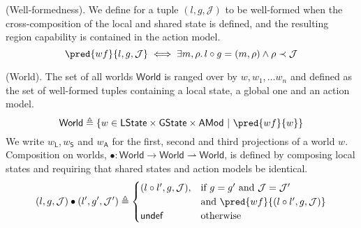  (Well-formedness). We define for a tuple $(l, g, \mathcal{J})$ to be well-formed when the cross-composition of the local and shared state is defined, and the resulting region capability is contained in the action model.
\[
	\pred{wf}{l, g, \mathcal{J}} \iff \exists m, \rho \ldotp l \circ g = (m, \rho) \land \rho \prec \mathcal{J}
\]

 (World). The set of all worlds $\mathsf{World}$ is ranged over by $w, w_1, \ldots w_n$ and defined as the set of well-formed tuples containing a local state, a global one and an action model.
\[
	\mathsf{World} \triangleq \{ w \in \mathsf{LState} \times \mathsf{GState} \times \mathsf{AMod}\ |\ \pred{wf}{w} \}
\]
We write $w_\mathsf{L}, w_\mathsf{S}$ and $w_\mathsf{A}$ for the first, second and third projections of a world $w$. Composition on worlds, $\bullet : \mathsf{World} \rightarrow \mathsf{World} \rightharpoonup \mathsf{World}$, is defined by composing local states and requiring that shared states and action models be identical.
\[
	(l, g, \mathcal{J}) \bullet (l', g', \mathcal{J}') \triangleq
	\begin{cases}
		(l \circ l', g, \mathcal{J}), & \text{if } g = g' \text{ and } \mathcal{J} = \mathcal{J}' \\ & \text{and } \pred{wf}{(l \circ l', g, \mathcal{J})}
		\\
		\mathsf{undef} & \text{otherwise}
	\end{cases}
\]